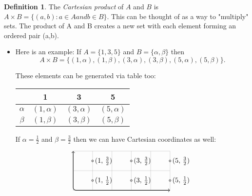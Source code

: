 \documentclass{amsart} %
\theoremstyle{definition} %
\newtheorem*{dfn}{Definition} %
\theoremstyle{definition}
\theoremstyle{remark} %
\begin{document}
\begin{dfn}
 \quad The \emph{Cartesian product} of $A$ and $B$ is $A \times B = \{(a,b): a \in A and b \in B \} $. This can be thought of as a way to "multiply" sets. The product of A and B creates a new set with each element forming an ordered pair (a,b).
      \begin{itemize}
            \item Here is an example: If $A = \{1, 3, 5 \}$ and $B = \{\alpha, \beta \} $ then
                  \[ A \times B = \{(1, \alpha), (1, \beta), (3, \alpha), (3, \beta), (5, \alpha), (5, \beta) \}. \]

                  These elements can be generated via table too:
                  \begin{center}
                  \begin{tabular}{c | c | c | c}
                        & 1 & 3 & 5 \\
                        \hline
                        $\alpha$ & $(1, \alpha)$ & $(3, \alpha)$ & $(5, \alpha)$ \\
                        $\beta$ & $(1, \beta)$ & $(3, \beta)$ & $(5, \beta)$ \\
                  \end{tabular}
                  \end{center}

                  If $\alpha = \frac{1}{2}$ and $\beta = \frac{3}{2}$ then we can have Cartesian coordinates as well:

                 \[ \begin{tikzpicture}
                        \draw[<->, rounded corners, thick] (0,2) -- (0,0) -- (5, 0);
                        \draw[help lines] (0, 0) grid (5, 2);
                        \draw[fill = lightgray] (1, 0.5) circle [radius = 0.05];
                        \node [right] at (1, 0.5) {(1, $\frac{1}{2}$)};
                        \draw[fill = lightgray] (3, 0.5) circle [radius = 0.05];
                        \node [right] at (3, 0.5) {(3, $\frac{1}{2}$)};
                        \draw[fill = lightgray] (5, 0.5) circle [radius = 0.05];
                        \node [right] at (5, 0.5) {(5, $\frac{1}{2}$)};
                        \draw[fill = lightgray] (1, 1.5) circle [radius = 0.05];
                        \node [right] at (1, 1.5) {(1, $\frac{3}{2}$)};
                        \draw[fill = lightgray] (3, 1.5) circle [radius = 0.05];
                        \node [right] at (3, 1.5) {(3, $\frac{3}{2}$)};
                        \draw[fill = lightgray] (5, 1.5) circle [radius = 0.05];
                        \node [right] at (5, 1.5) {(5, $\frac{3}{2}$)};
                  \end{tikzpicture} \]

      \end{itemize}
\end{dfn}
\end{document}
